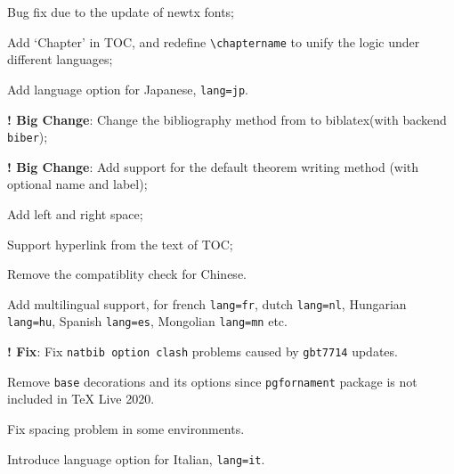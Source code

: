 \documentclass[11pt,bibend=bibtex]{elegantbook}
\begin{document}

\begin{change}
  \item Bug fix due to the update of newtx fonts;
  \item Add `Chapter' in TOC, and redefine \lstinline{\chaptername} to unify the logic under different languages;
  \item Add language option for Japanese, \lstinline{lang=jp}.
\end{change}



\begin{change}
  \item \textbf{! Big Change}: Change the bibliography method from  to biblatex(with backend  \lstinline{biber});
  \item \textbf{! Big Change}: Add support for the default theorem writing method (with optional name and label);
  \item Add left and right space;
  \item Support hyperlink from the text of TOC;
  \item Remove the  compatiblity check for Chinese.
  \item Add multilingual support, for french \lstinline{lang=fr}, dutch \lstinline{lang=nl}, Hungarian  \lstinline{lang=hu}, Spanish \lstinline{lang=es}, Mongolian \lstinline{lang=mn} etc.
\end{change}



\begin{change}
  \item \textbf{! Fix}: Fix \lstinline{natbib option clash} problems caused by \lstinline{gbt7714} updates.
  \item Remove \lstinline{base} decorations and its options since \lstinline{pgfornament} package is not included in \TeX{} Live 2020.
  \item Fix spacing problem in some environments.
  \item Introduce language option for Italian, \lstinline{lang=it}.
\end{change}


\end{document}
